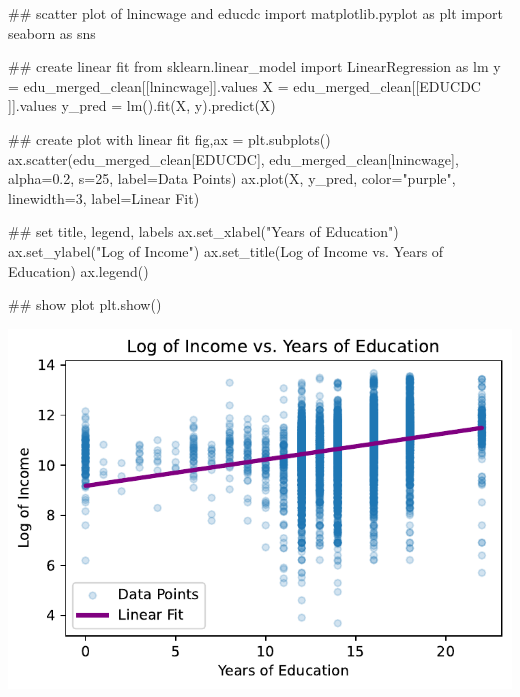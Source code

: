 \documentclass[
  letterpaper,
  DIV=11,
  numbers=noendperiod]{scrartcl}
\newenvironment{Shaded}{\begin{snugshade}}{\end{snugshade}}
\newcommand{\CommentTok}[1]{\textcolor[rgb]{0.37,0.37,0.37}{#1}}
\newcommand{\DecValTok}[1]{\textcolor[rgb]{0.68,0.00,0.00}{#1}}
\newcommand{\FloatTok}[1]{\textcolor[rgb]{0.68,0.00,0.00}{#1}}
\newcommand{\ImportTok}[1]{\textcolor[rgb]{0.00,0.46,0.62}{#1}}
\newcommand{\NormalTok}[1]{\textcolor[rgb]{0.00,0.23,0.31}{#1}}
\newcommand{\OperatorTok}[1]{\textcolor[rgb]{0.37,0.37,0.37}{#1}}
\newcommand{\StringTok}[1]{\textcolor[rgb]{0.13,0.47,0.30}{#1}}
\begin{document}
\begin{Shaded}
\begin{Highlighting}[]
\CommentTok{\#\# scatter plot of lnincwage and educdc}
\ImportTok{import}\NormalTok{ matplotlib.pyplot }\ImportTok{as}\NormalTok{ plt }
\ImportTok{import}\NormalTok{ seaborn }\ImportTok{as}\NormalTok{ sns }

\CommentTok{\#\# create linear fit }
\ImportTok{from}\NormalTok{ sklearn.linear\_model }\ImportTok{import}\NormalTok{ LinearRegression }\ImportTok{as}\NormalTok{ lm}
\NormalTok{y }\OperatorTok{=}\NormalTok{ edu\_merged\_clean[[}\StringTok{\textquotesingle{}lnincwage\textquotesingle{}}\NormalTok{]].values}
\NormalTok{X }\OperatorTok{=}\NormalTok{ edu\_merged\_clean[[}\StringTok{\textquotesingle{}EDUCDC\textquotesingle{}}\NormalTok{ ]].values}
\NormalTok{y\_pred }\OperatorTok{=}\NormalTok{ lm().fit(X, y).predict(X)}

\CommentTok{\#\# create plot with linear fit}
\NormalTok{fig,ax }\OperatorTok{=}\NormalTok{ plt.subplots()}
\NormalTok{ax.scatter(edu\_merged\_clean[}\StringTok{\textquotesingle{}EDUCDC\textquotesingle{}}\NormalTok{], edu\_merged\_clean[}\StringTok{\textquotesingle{}lnincwage\textquotesingle{}}\NormalTok{], alpha}\OperatorTok{=}\FloatTok{0.2}\NormalTok{, s}\OperatorTok{=}\DecValTok{25}\NormalTok{, label}\OperatorTok{=}\StringTok{\textquotesingle{}Data Points\textquotesingle{}}\NormalTok{)}
\NormalTok{ax.plot(X, y\_pred, color}\OperatorTok{=}\StringTok{"purple"}\NormalTok{, linewidth}\OperatorTok{=}\DecValTok{3}\NormalTok{, label}\OperatorTok{=}\StringTok{\textquotesingle{}Linear Fit\textquotesingle{}}\NormalTok{)}

\CommentTok{\#\# set title, legend, labels}
\NormalTok{ax.set\_xlabel(}\StringTok{"Years of Education"}\NormalTok{)}
\NormalTok{ax.set\_ylabel(}\StringTok{"Log of Income"}\NormalTok{)}
\NormalTok{ax.set\_title(}\StringTok{\textquotesingle{}Log of Income vs. Years of Education\textquotesingle{}}\NormalTok{)}
\NormalTok{ax.legend()}

\CommentTok{\#\# show plot }
\NormalTok{plt.show()}
\end{Highlighting}
\end{Shaded}

\includegraphics{mini-lesson-1_files/figure-pdf/cell-9-output-1.pdf}
\end{document}
